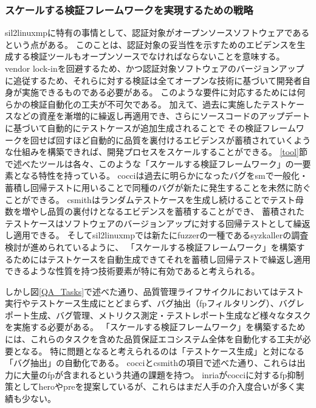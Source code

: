 \subsubsection{スケールする検証フレームワークを実現するための戦略}
\label{scale}
\acrshort{sil2linuxmp}に特有の事情として、認証対象がオープンソースソフトウェアであるという点がある。
このことは、認証対象の妥当性を示すためのエビデンスを生成する検証ツールもオープンソースでなければならないことを意味する。
vendor lock-inを回避するため、かつ認証対象ソフトウェアのバージョンアップに追従するため、それらに対する検証は全てオープンな技術に基づいて開発者自身が実施できるものである必要がある。
このような要件に対応するためには何らかの検証自動化の工夫が不可欠である。
加えて、過去に実施したテストケースなどの資産を漸増的に繰返し再適用でき、さらにソースコードのアップデートに基づいて自動的にテストケースが追加生成されることで
その検証フレームワークを回せば回すほど自動的に品質を裏付けるエビデンスが蓄積されていくような仕組みを構築できれば、開発プロセスをスケールすることができる。
\ref{tool}節で述べたツールは各々、このような「スケールする検証フレームワーク」の一要素となる特性を持っている。
\acrshort{cocci}は過去に明らかになったバグを\acrshort{sm}で一般化・蓄積し回帰テストに用いることで同種のバグが新たに発生することを未然に防ぐことができる。
\acrshort{csmith}はランダムテストケースを生成し続けることでテスト母数を増やし品質の裏付けとなるエビデンスを蓄積することができ、
蓄積されたテストケースはソフトウェアのバージョンアップに対する回帰テストとして繰返し適用できる。
そして\acrshort{sil2linuxmp}では新たに\acrshort{fuzzer}の一種である\acrshort{syzkaller}の調査検討が進められているように、
「スケールする検証フレームワーク」を構築するためにはテストケースを自動生成できてそれを蓄積し回帰テストで繰返し適用できるような性質を持つ技術要素が特に有効であると考えられる。
\par
しかし図\ref{QA_Tasks}で述べた通り、品質管理ライフサイクルにおいてはテスト実行やテストケース生成にとどまらず、バグ抽出（\acrshort{fp}フィルタリング）、バグレポート生成、バグ管理、メトリクス測定・テストレポート生成など様々なタスクを実施する必要がある。
「スケールする検証フレームワーク」を構築するためには、これらのタスクを含めた品質保証エコシステム全体を自動化する工夫が必要となる。
特に問題となると考えられるのは「テストケース生成」と対になる「バグ抽出」の自動化である。
\acrshort{cocci}と\acrshort{csmith}の項目で述べた通り、これらは出力に大量の\acrshort{fp}が含まれるという共通の課題を持つ。
\acrshort{inria}が\acrshort{cocci}に対する\acrshort{fp}抑制策として\acrshort{hero}や\acrshort{pre}を提案しているが、これらはまだ人手の介入度合いが多く実績も少ない。
